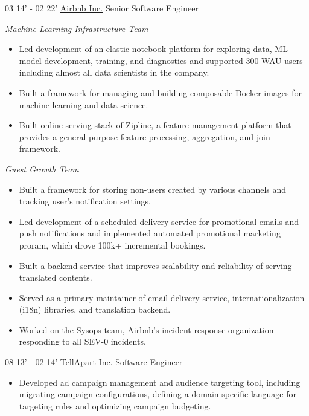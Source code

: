 \documentclass[]{patyoon-cv}
\begin{document}
\begin{entrylist}
  \entry
  {03 14' - 02 22'}
  {\href{https://www.airbnb.com/}{Airbnb Inc.}}
  {Senior Software Engineer}
    {\begin{spacing}{0.5} \end{spacing}
      \emph{\small Machine Learning Infrastructure Team}\\
          \begin{itemize}
    \item Led development of an elastic notebook platform for exploring data, ML model development, training, and diagnostics and supported 300 WAU users including almost all data scientists in the company.
    \item Built a framework for managing and building composable Docker images for machine learning and data science.
    \item Built online serving stack of Zipline, a feature management platform that provides a general-purpose feature processing, aggregation, and join framework.
    \end{itemize}
  \begin{spacing}{1.5} \end{spacing}
      \emph{\small Guest Growth Team}\\
    \begin{itemize}
    \item Built a framework for storing non-users created by various channels and tracking user's notification settings.
    \item Led development of a scheduled delivery service for promotional emails and push notifications and implemented automated promotional marketing proram, which drove 100k+ incremental bookings.
    \item Built a backend service that improves scalability and reliability of serving translated contents.
    \item Served as a primary maintainer of email delivery service, internationalization (i18n) libraries, and translation backend.
    \item Worked on the Sysops team, Airbnb's incident-response organization responding to all SEV-0 incidents.
    \end{itemize}
  }
  \entry
  {08 13' - 02 14'}
  {\href{https://tellapart.com/}{TellApart Inc.}}
  {Software Engineer}
  {\begin{itemize}
    \item Developed ad campaign management and audience targeting tool, including migrating campaign configurations, defining a domain-specific language for targeting rules and optimizing campaign budgeting.

\end{itemize}}
\end{entrylist}
\end{document}
